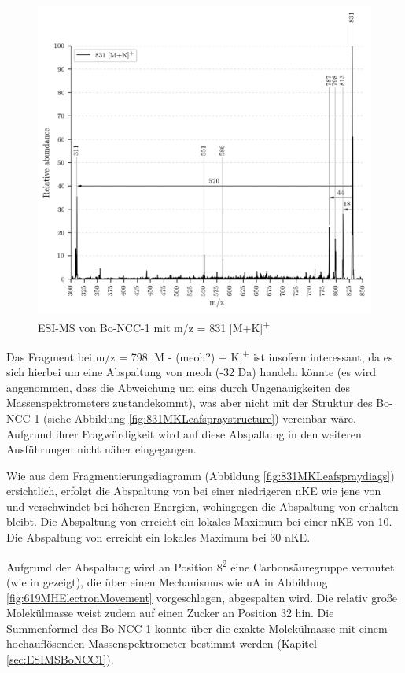 \begin{figure}[!htbp]
  \includegraphics[width=\textwidth, height=0.7\textwidth]{figures/Kapitel4/Kataboliten/VWA_MS_LeafSpray_831.png}
  \caption[ESI-MS Spektrum von Bo-NCC-1, Quelle: Autor]{ESI-MS von Bo-NCC-1 mit m/z = 831 [M+K]\textsuperscript{+}}
  \label{fig:831MKLeafspray}
\end{figure}

Das Fragment bei m/z = 798 [M - (\gls{meoh}?) + K]\textsuperscript{+} ist insofern interessant, da es sich hierbei um eine Abspaltung von \gls{meoh} (-32 Da) handeln könnte (es wird angenommen, dass die Abweichung um eins durch Ungenauigkeiten des Massenspektrometers zustandekommt), was aber nicht mit der Struktur des Bo-NCC-1 (siehe Abbildung \ref{fig:831MKLeafspraystructure}) vereinbar wäre. Aufgrund ihrer Fragwürdigkeit wird auf diese Abspaltung in den weiteren Ausführungen nicht näher eingegangen.

Wie aus dem Fragmentierungsdiagramm (Abbildung \ref{fig:831MKLeafspraydiags}) ersichtlich, erfolgt die Abspaltung von  bei einer niedrigeren \gls{nKE} wie jene von  und verschwindet bei höheren Energien, wohingegen die Abspaltung von  erhalten bleibt. Die Abspaltung von  erreicht ein lokales Maximum bei einer \gls{nKE} von 10. Die Abspaltung von  erreicht ein lokales Maximum bei 30 \gls{nKE}.

Aufgrund der  Abspaltung wird an Position 8\textsuperscript{2} eine Carbonsäuregruppe vermutet (wie in \cite{StructureElucidation} gezeigt), die über einen Mechanismus wie \gls{uA} in Abbildung \ref{fig:619MHElectronMovement} vorgeschlagen, abgespalten wird. Die relativ große Molekülmasse weist zudem auf einen Zucker an Position 32 hin. Die Summenformel des Bo-NCC-1 konnte über die exakte Molekülmasse mit einem hochauflösenden Massenspektrometer bestimmt werden (Kapitel \ref{sec:ESIMSBoNCC1}).

